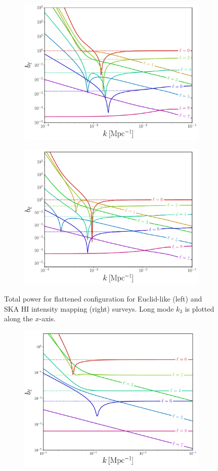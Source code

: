 {\begin{figure}[ht]
\begin{subfigure}{0.5\textwidth}
\includegraphics[width=0.85\linewidth]{fig/totP_Euclid_flat2.pdf}
\end{subfigure}%
\begin{subfigure}{0.5\textwidth}
\includegraphics[width=0.85\linewidth]{fig/totP_IM_flat2.pdf}
\end{subfigure}
\caption{Total power for flattened configuration for Euclid-like (left) and SKA HI intensity mapping (right) surveys. Long mode \(k_3\) is plotted along the \(x\)-axis. \label{fig:totpowerfl}}
\end{figure}
\begin{figure}[ht]
\begin{subfigure}{0.5\textwidth}
\includegraphics[width=0.85\linewidth]{fig/totP_euclid_equi2.pdf}

\end{subfigure}
\end{figure}}
